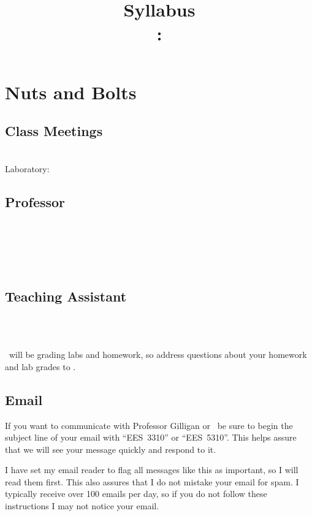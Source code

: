 \documentclass[11pt,twoside]{jgsyllabus}\usepackage[]{graphicx}\usepackage[]{color}
\title{Syllabus\\
\ShortCourseNumber: \LongCourseName}
\begin{document}
\maketitle
\tableofcontents

\clearpage
\section[Nuts \& Bolts]{Nuts and Bolts}
\label{sec:NutsAndBolts}
\subsection{Class Meetings}
\ClassMeetings\\
Laboratory: \LabMeetings
\subsection{Professor}
\label{sec:Professor}
\ProfName\\
\ProfDescr\\
\ProfEmail\\
\ProfWeb\\
\ProfOfficeHours
%

\subsection{Teaching Assistant}
\label{sec:TA}
\TaName\\
\TaEmail\\
\TaOfficeHours
\medskip

\noindent
\TaTitle\ will be grading labs and homework, so address questions about your homework and lab grades
to \TaAccusative.

\subsection{Email}
If you want to communicate with Professor Gilligan or \TaTitle\ be sure to begin the
subject line of your email with ``{\scshape EES~3310}'' or ``{\scshape EES~5310}''. This helps assure
that we will see your message quickly and respond to it.

I have set my email reader to flag all messages like this as important, so I will read
them first. This also assures that I do not mistake your email for spam. I typically
receive over 100 emails per day, so if you do not follow these instructions I may not
notice your email.
\end{document}
